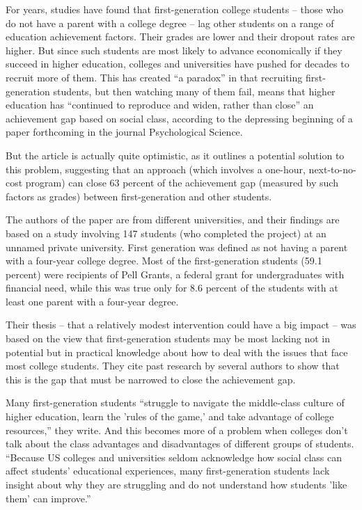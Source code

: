 For years, studies have found that first-generation college students – those who do not have a parent with a college degree – lag other students on a range of education achievement factors. Their grades are lower and their dropout rates are higher. But since such students are most likely to advance economically if they succeed in higher education, colleges and universities have pushed for decades to recruit more of them. This has created ``a paradox'' in that recruiting first-generation students, but then watching many of them fail, means that higher education has ``continued to reproduce and widen, rather than close'' an achievement gap based on social class, according to the depressing beginning of a paper forthcoming in the journal Psychological Science.


But the article is actually quite optimistic, as it outlines a potential solution to this problem, suggesting that an approach (which involves a one-hour, next-to-no-cost program) can close 63 percent of the achievement gap (measured by such factors as grades) between first-generation and other students.


The authors of the paper are from different universities, and their findings are based on a study involving 147 students (who completed the project) at an unnamed private university. First generation was defined as not having a parent with a four-year college degree. Most of the first-generation students (59.1 percent) were recipients of Pell Grants, a federal grant for undergraduates with financial need, while this was true only for 8.6 percent of the students with at least one parent with a four-year degree.


Their thesis – that a relatively modest intervention could have a big impact – was based on the view that first-generation students may be most lacking not in potential but in practical knowledge about how to deal with the issues that face most college students. They cite past research by several authors to show that this is the gap that must be narrowed to close the achievement gap.


Many first-generation students ``struggle to navigate the middle-class culture of higher education, learn the 'rules of the game,' and take advantage of college resources,'' they write. And this becomes more of a problem when colleges don't talk about the class advantages and disadvantages of different groups of students. ``Because US colleges and universities seldom acknowledge how social class can affect students' educational experiences, many first-generation students lack insight about why they are struggling and do not understand how students 'like them' can improve.''